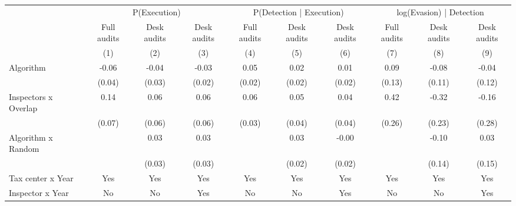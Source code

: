 \begin{tabular}{lccc|ccc|ccc} \toprule
\multicolumn{1}{l}{} & \multicolumn{3}{c}{P(Execution)} & \multicolumn{3}{c}{P(Detection | Execution)} & \multicolumn{3}{c}{log(Evasion) | Detection} \\\cmidrule(lr){2-4}\cmidrule(lr){5-7}\cmidrule(lr){8-10} \multicolumn{1}{l}{} & Full audits & Desk audits & Desk audits & Full audits & Desk audits & Desk audits & Full audits & Desk audits & Desk audits \\ \multicolumn{1}{l}{} & (1) & (2) & (3) & (4) & (5) & (6) & (7) & (8) & (9) \\ \midrule
Algorithm   &       -0.06\sym{*}  &       -0.04\sym{*}  &       -0.03         &        0.05\sym{**} &        0.02         &        0.01         &        0.09         &       -0.08         &       -0.04         \\
            &      (0.04)         &      (0.03)         &      (0.02)         &      (0.02)         &      (0.02)         &      (0.02)         &      (0.13)         &      (0.11)         &      (0.12)         \\
\addlinespace
Inspectors x Overlap&        0.14\sym{*}  &        0.06         &        0.06         &        0.06         &        0.05         &        0.04         &        0.42         &       -0.32         &       -0.16         \\
            &      (0.07)         &      (0.06)         &      (0.06)         &      (0.03)         &      (0.04)         &      (0.04)         &      (0.26)         &      (0.23)         &      (0.28)         \\
\addlinespace
Algorithm x Random&                     &        0.03         &        0.03         &                     &        0.03         &       -0.00         &                     &       -0.10         &        0.03         \\
            &                     &      (0.03)         &      (0.03)         &                     &      (0.02)         &      (0.02)         &                     &      (0.14)         &      (0.15)         \\
\midrule
Tax center x Year&         Yes         &         Yes         &         Yes         &         Yes         &         Yes         &         Yes         &         Yes         &         Yes         &         Yes         \\
Inspector x Year&          No         &          No         &         Yes         &          No         &          No         &         Yes         &          No         &          No         &         Yes         \\

\end{tabular}
